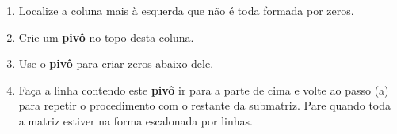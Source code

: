 \documentclass{beamer}
\begin{document}
    \begin{frame}
        \begin{observacao}
            \begin{enumerate}[label=({\alph*})]
                \item Localize a coluna mais à esquerda que não é toda formada por zeros.
                \item Crie um \textbf{pivô} no topo desta coluna.
                \item Use o \textbf{pivô} para criar zeros abaixo dele.
                \item Faça a linha contendo este \textbf{pivô} ir para a parte de cima e volte ao passo (a) para repetir o procedimento com o restante da submatriz. Pare quando toda a matriz estiver na forma escalonada por linhas.
            \end{enumerate}
        \end{observacao}
    \end{frame}
\end{document}
